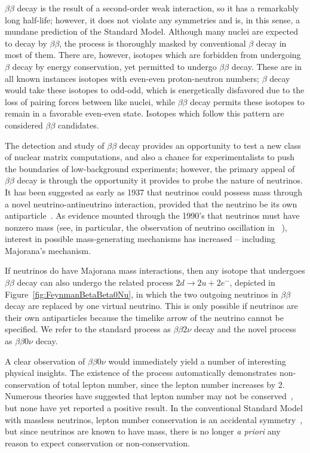 $\beta\beta$ decay is the result of a second-order weak interaction, so it has a remarkably long half-life; however, it does not violate any symmetries and is, in this sense, a mundane prediction of the Standard Model.  Although many nuclei are expected to decay by $\beta\beta$, the process is thoroughly masked by conventional $\beta$ decay in most of them.  There are, however, isotopes which are forbidden from undergoing $\beta$ decay by energy conservation, yet permitted to undergo $\beta\beta$ decay.  These are in all known instances isotopes with even-even proton-neutron numbers; $\beta$ decay would take these isotopes to odd-odd, which is energetically disfavored due to the loss of pairing forces between like nuclei, while $\beta\beta$ decay permits these isotopes to remain in a favorable even-even state.  Isotopes which follow this pattern are considered $\beta\beta$ candidates.

The detection and study of $\beta\beta$ decay provides an opportunity to test a new class of nuclear matrix computations, and also a chance for experimentalists to push the boundaries of low-background experiments; however, the primary appeal of $\beta\beta$ decay is through the opportunity it provides to probe the nature of neutrinos.  It has been suggested as early as 1937 that neutrinos could possess mass through a novel neutrino-antineutrino interaction, provided that the neutrino be its own antiparticle~\cite{Majorana}.  As evidence mounted through the 1990's that neutrinos must have nonzero mass (see, in particular, the observation of neutrino oscillation in ~\cite{SuperK}), interest in possible mass-generating mechanisms has increased -- including Majorana's mechanism.

If neutrinos do have Majorana mass interactions, then any isotope that undergoes $\beta\beta$ decay can also undergo the related process $2d \rightarrow 2u + 2e^-$, depicted in Figure~\ref{fig:FeynmanBetaBeta0Nu}, in which the two outgoing neutrinos in $\beta\beta$ decay are replaced by one virtual neutrino.  This is only possible if neutrinos are their own antiparticles because the timelike arrow of the neutrino cannot be specified.  We refer to the standard process as $\beta\beta 2\nu$ decay and the novel process as $\beta\beta 0\nu$ decay.

A clear observation of $\beta\beta 0\nu$ would immediately yield a number of interesting physical insights.  The existence of the process automatically demonstrates non-conservation of total lepton number, since the lepton number increases by 2.  Numerous theories have suggested that lepton number may not be conserved~\cite{ProtonDecay}\cite{MuonToPositron}, but none have yet reported a positive result.  In the conventional Standard Model with massless neutrinos, lepton number conservation is an accidental symmetry~\cite{LeptonConservation}, but since neutrinos are known to have mass, there is no longer \textit{a priori} any reason to expect conservation or non-conservation.

